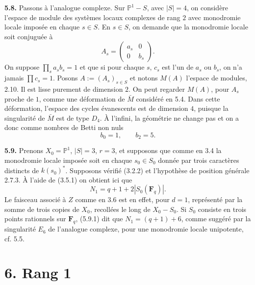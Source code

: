 \documentclass[11pt]{article}
\newcommand{\Fq}{\mathbf{F}_q}
\newcommand{\Pone}{\mathbb{P}^{1}}
\newcommand{\para}[1]{\medskip\noindent\textbf{#1}\enspace}
\begin{document}
\para{5.8.} Passons à l'analogue complexe. Sur \(\Pone-S\), avec \(|S|=4\), on considère l'espace de module des systèmes locaux complexes de rang \(2\) avec monodromie locale imposée en chaque \(s\in S\). En \(s\in S\), on demande que la monodromie locale soit conjuguée à
\[
  A_s=\begin{pmatrix} a_s&0\\0&b_s\end{pmatrix}.
\]
On suppose \(\prod_s a_s b_s=1\) et que si pour chaque \(s\), \(c_s\) est l'un de \(a_s\) ou \(b_s\), on n'a jamais \(\prod c_s=1\). Posons \(A:=(A_s)_{s\in S}\) et notons \(M(A)\) l'espace de modules, 2.10. Il est lisse purement de dimension \(2\). On peut regarder \(M(A)\), pour \(A_s\) proche de \(1\), comme une déformation de \(\bar M\) considéré en 5.4. Dans cette déformation, l'espace des cycles évanescents est de dimension \(4\), puisque la singularité de \(\bar M\) est de type \(D_4\). À l'infini, la géométrie ne change pas et on a donc comme nombres de Betti non nuls
\begin{equation}
  b_0=1,\qquad b_2=5.
\tag{5.4.1}
\end{equation}

\para{5.9.} Prenons \(X_0=\Pone\), \(|S|=3\), \(r=3\), et supposons que comme en 3.4 la monodromie locale imposée soit en chaque \(s_0\in S_0\) donnée par trois caractères distincts de \(k(s_0)^*\). Supposons vérifié (3.2.2) et l'hypothèse de position générale 2.7.3. À l'aide de (3.5.1) on obtient ici que
\begin{equation}
  N_1=q+1+2|S_0(\Fq)|.
\tag{5.9.1}
\end{equation}
Le faisceau associé à \(Z\) comme en 3.6 est en effet, pour \(d=1\), représenté par la somme de trois copies de \(X_0\), recollées le long de \(X_0-S_0\). Si \(S_0\) consiste en trois points rationnels sur \(\Fq\), (5.9.1) dit que \(N_1=(q+1)+6\), comme suggéré par la singularité \(E_6\) de l'analogue complexe, pour une monodromie locale unipotente, cf. 5.5.

\section*{6. Rang 1}
\end{document}
